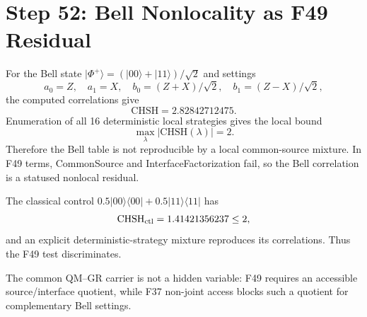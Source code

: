 \section*{Step 52: Bell Nonlocality as F49 Residual}

For the Bell state \(|\Phi^+\rangle=(|00\rangle+|11\rangle)/\sqrt2\)
and settings
\[
a_0=Z,\quad a_1=X,\quad b_0=(Z+X)/\sqrt2,\quad b_1=(Z-X)/\sqrt2,
\]
the computed correlations give
\[
\mathrm{CHSH}= 2.82842712475 .
\]
Enumeration of all 16 deterministic local strategies gives the local bound
\[
\max_\lambda |\mathrm{CHSH}(\lambda)| = 2 .
\]
Therefore the Bell table is not reproducible by a local common-source mixture.
In F49 terms, CommonSource and InterfaceFactorization fail, so the Bell
correlation is a statused nonlocal residual.

The classical control \(0.5|00\rangle\langle00|+0.5|11\rangle\langle11|\)
has
\[
\mathrm{CHSH}_{\rm ctl}= 1.41421356237\le 2,
\]
and an explicit deterministic-strategy mixture reproduces its correlations.
Thus the F49 test discriminates.

The common QM--GR carrier is not a hidden variable: F49 requires an accessible
source/interface quotient, while F37 non-joint access blocks such a quotient
for complementary Bell settings.
